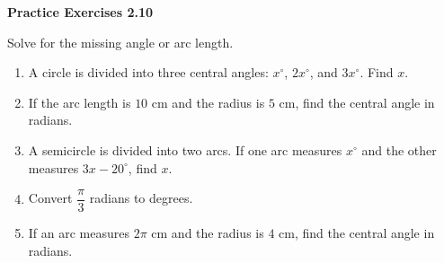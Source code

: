 \vspace{0.3ex}
\noindent\textbf{Practice Exercises 2.10}

\vspace{0.2ex}

Solve for the missing angle or arc length.

\begin{enumerate}
    \item A circle is divided into three central angles: $x^\circ$, $2x^\circ$, and $3x^\circ$. Find $x$.
    \item If the arc length is $10$ cm and the radius is $5$ cm, find the central angle in radians.
    \item A semicircle is divided into two arcs. If one arc measures $x^\circ$ and the other measures $3x - 20^\circ$, find $x$.
    \item Convert $\dfrac{\pi}{3}$ radians to degrees.
    \item If an arc measures $2\pi$ cm and the radius is $4$ cm, find the central angle in radians.
\end{enumerate}
